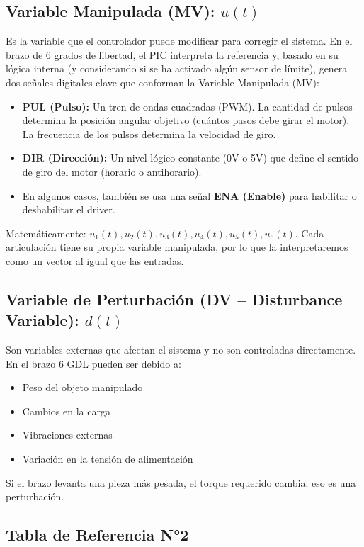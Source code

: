 \documentclass[11pt]{article}
\begin{document}
\subsection{Variable Manipulada (MV): $u(t)$}

Es la variable que el controlador puede modificar para corregir el sistema. En el brazo de 6 grados de libertad, el PIC interpreta la referencia y, basado en su lógica interna (y considerando si se ha activado algún sensor de límite), genera dos señales digitales clave que conforman la Variable Manipulada (MV):

\begin{itemize}
	\item \textbf{PUL (Pulso):} Un tren de ondas cuadradas (PWM). La cantidad de pulsos determina la posición angular objetivo (cuántos pasos debe girar el motor). La frecuencia de los pulsos determina la velocidad de giro.
	\item \textbf{DIR (Dirección):} Un nivel lógico constante (0V o 5V) que define el sentido de giro del motor (horario o antihorario).
	\item En algunos casos, también se usa una señal \textbf{ENA (Enable)} para habilitar o deshabilitar el driver.
\end{itemize}

Matemáticamente: $u_1(t), u_2(t), u_3(t), u_4(t), u_5(t), u_6(t)$. Cada articulación tiene su propia variable manipulada, por lo que la interpretaremos como un vector al igual que las entradas.

\subsection{Variable de Perturbación (DV – Disturbance Variable): $d(t)$}

Son variables externas que afectan el sistema y no son controladas directamente. En el brazo 6 GDL pueden ser debido a:

\begin{itemize}
	\item Peso del objeto manipulado
	\item Cambios en la carga
	\item Vibraciones externas
	\item Variación en la tensión de alimentación
\end{itemize}

Si el brazo levanta una pieza más pesada, el torque requerido cambia; eso es una perturbación.

\subsection{Tabla de Referencia N°2}
\end{document}
